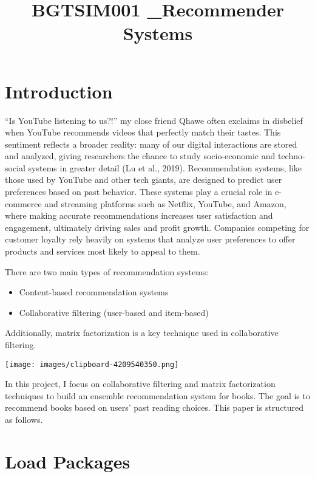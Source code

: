 \documentclass[
]{report}
\title{BGTSIM001 \_Recommender Systems}
\author{}
\date{}
\renewcommand*\contentsname{Table of contents}
\newcommand\contentsname{Table of contents}
\begin{document}
\maketitle

\renewcommand*\contentsname{Table of contents}
{
\hypersetup{linkcolor=}
\setcounter{tocdepth}{2}
\tableofcontents
}
\section{Introduction}\label{introduction}

``Is YouTube listening to us?!'' my close friend Qhawe often exclaims in
disbelief when YouTube recommends videos that perfectly match their
tastes. This sentiment reflects a broader reality: many of our digital
interactions are stored and analyzed, giving researchers the chance to
study socio-economic and techno-social systems in greater detail (Lu et
al., 2019). Recommendation systems, like those used by YouTube and other
tech giants, are designed to predict user preferences based on past
behavior. These systems play a crucial role in e-commerce and streaming
platforms such as Netflix, YouTube, and Amazon, where making accurate
recommendations increases user satisfaction and engagement, ultimately
driving sales and profit growth. Companies competing for customer
loyalty rely heavily on systems that analyze user preferences to offer
products and services most likely to appeal to them.

There are two main types of recommendation systems:

\begin{itemize}
\item
  Content-based recommendation systems
\item
  Collaborative filtering (user-based and item-based)
\end{itemize}

Additionally, matrix factorization is a key technique used in
collaborative filtering.

\begin{center}
\texttt{[image: images/clipboard-4209540350.png]}
\end{center}

In this project, I focus on collaborative filtering and matrix
factorization techniques to build an ensemble recommendation system for
books. The goal is to recommend books based on users' past reading
choices. This paper is structured as follows.

\section{Load Packages}\label{load-packages}
\end{document}
